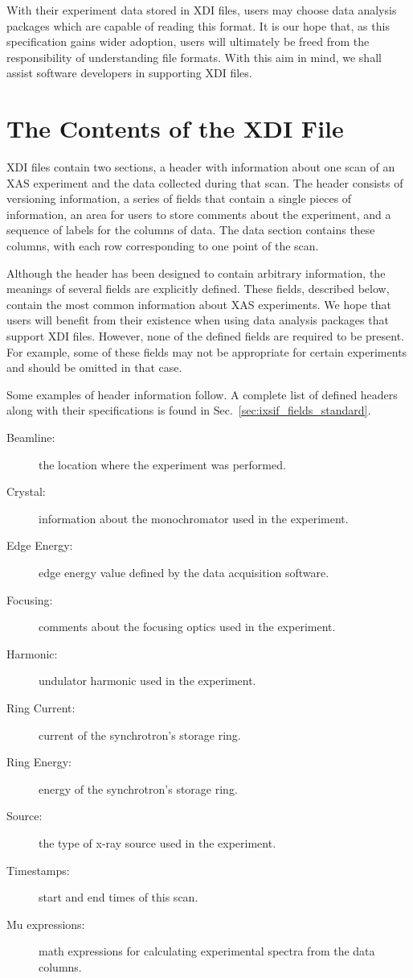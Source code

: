 \documentclass{article}
\newcommand{\xdi}{\textsf{XDI}}
\begin{document}
With their experiment data stored in {\xdi} files, users may choose
data analysis packages which are capable of reading this format.  It
is our hope that, as this specification gains wider adoption, users
will ultimately be freed from the responsibility of understanding file
formats.  With this aim in mind, we shall assist software developers
in supporting {\xdi} files.


\section{The Contents of the XDI File}
\label{sec:contents_ixsif}

{\xdi} files contain two sections, a header with information about one
scan of an XAS experiment and the data collected during that scan.
The header consists of versioning information, a series of fields that
contain a single pieces of information, an area for users to store
comments about the experiment, and a sequence of labels for the
columns of data.  The data section contains these columns, with each
row corresponding to one point of the scan.

Although the header has been designed to contain arbitrary
information, the meanings of several fields are explicitly defined.
These fields, described below, contain the most common information
about XAS experiments.  We hope that users will benefit from their
existence when using data analysis packages that support {\xdi}
files.  However, none of the defined fields are required to be
present.  For example, some of these fields may not be appropriate for
certain experiments and should be omitted in that case.

Some examples of header information follow.  A complete list of
defined headers along with their specifications is found in
Sec.~\ref{sec:ixsif_fields_standard}.

\begin{description}
\item[Beamline:] the location where the experiment was performed.
\item[Crystal:] information about the monochromator used in the
  experiment.
\item[Edge Energy:] edge energy value defined by the data acquisition
  software.
\item[Focusing:] comments about the focusing optics used in the
  experiment.
\item[Harmonic:] undulator harmonic used in the experiment.
\item[Ring Current:] current of the synchrotron's storage ring.
\item[Ring Energy:] energy of the synchrotron's storage ring.
\item[Source:] the type of x-ray source used in the experiment.
\item[Timestamps:] start and end times of this scan.
\item[Mu expressions:] math expressions for calculating experimental
  spectra from the data columns.
\end{description}
\end{document}
